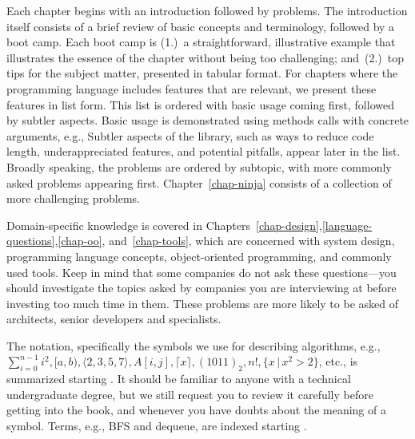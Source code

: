 \documentclass[10pt,openany,twoside,letterpaper,extrafontsizes]{memoir}
\newif\ifCpp
\newif\ifJava
\newif\ifPython
\newcommand{\myindex}[1]{%
\index[terms]{#1}%
}
\begin{document}
\begin{Spacing}{\introSpacing}
Each chapter begins with an introduction followed by problems.
The introduction itself consists of a brief review of basic concepts and terminology,
followed by a boot camp. Each boot camp is (1.)~a straightforward, illustrative example
that illustrates the essence of the chapter without being too challenging; and~(2.)~top tips for
the subject matter, presented in tabular format. For chapters where the programming language
includes features that are relevant,
we present these features in list form.
This list is ordered with basic usage coming first, followed by subtler aspects.
Basic usage is demonstrated using methods calls with concrete arguments, e.g.,
\ifCpp
\texttt{binary\_search(A.begin(), A.end(), 42)}.
\fi%
\ifJava
\texttt{Arrays.asList(1,2,4,8)}.
\fi%
\ifPython
\texttt{D = collections.OrderedDict({(1,2), (3,4)})}.
\fi%
Subtler aspects of the library, such as ways to reduce code length, underappreciated features,
and potential pitfalls, appear later in the list.
Broadly speaking, the problems are ordered by subtopic, with more commonly asked problems appearing first.
Chapter~\ref{chap-ninja} consists of a collection of more challenging problems.

Domain-specific knowledge is covered in Chapters~\ref{chap-design},\ref{language-questions},\ref{chap-oo},
and~\ref{chap-tools}, which are concerned with system design, programming language concepts,
object-oriented programming, and commonly used tools. Keep in mind that some companies do not
ask these questions---you should investigate the topics
asked by companies you are interviewing at before investing too much time in them.
These problems are more likely to be asked of architects, senior developers and specialists.

The notation, specifically the symbols we use for describing algorithms, e.g., $\sum_{i=0}^{n-1}i^2, [a,b),
\langle 2,3,5,7\rangle, A[i,j], \lceil x \rceil, (1011)_2, n!, \{x \,|\, x^2 > 2\}$, etc., is
summarized starting .
It should be familiar to anyone with a technical undergraduate degree, but we still
request you to review it carefully before getting into the book, and whenever
you have doubts about the meaning of a symbol.
Terms, e.g., \myindex{BFS}BFS and \myindex{dequeue}dequeue, are indexed starting .

\newenvironment{absolutelynopagebreak}
  {\par\nobreak\vfill\penalty0\vfilneg
   \vtop\bgroup}
  {\par\xdef\tpd{\the\prevdepth}\egroup
   \prevdepth=\tpd}



\end{Spacing}
\end{document}
